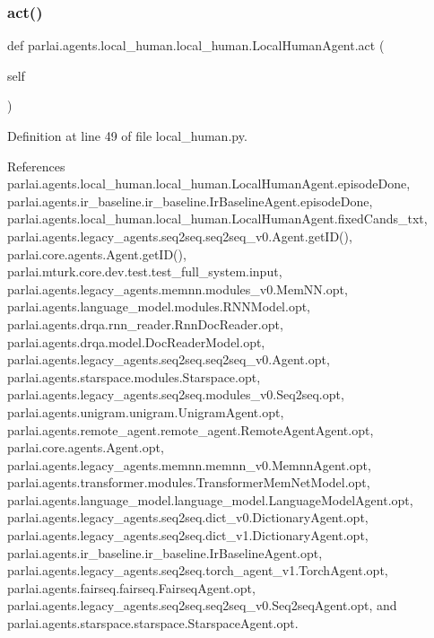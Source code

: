 \subsubsection{\texorpdfstring{act()}{act()}}
{\footnotesize\ttfamily def parlai.\+agents.\+local\+\_\+human.\+local\+\_\+human.\+Local\+Human\+Agent.\+act (\begin{DoxyParamCaption}\item[{}]{self }\end{DoxyParamCaption})}



Definition at line 49 of file local\+\_\+human.\+py.



References parlai.\+agents.\+local\+\_\+human.\+local\+\_\+human.\+Local\+Human\+Agent.\+episode\+Done, parlai.\+agents.\+ir\+\_\+baseline.\+ir\+\_\+baseline.\+Ir\+Baseline\+Agent.\+episode\+Done, parlai.\+agents.\+local\+\_\+human.\+local\+\_\+human.\+Local\+Human\+Agent.\+fixed\+Cands\+\_\+txt, parlai.\+agents.\+legacy\+\_\+agents.\+seq2seq.\+seq2seq\+\_\+v0.\+Agent.\+get\+I\+D(), parlai.\+core.\+agents.\+Agent.\+get\+I\+D(), parlai.\+mturk.\+core.\+dev.\+test.\+test\+\_\+full\+\_\+system.\+input, parlai.\+agents.\+legacy\+\_\+agents.\+memnn.\+modules\+\_\+v0.\+Mem\+N\+N.\+opt, parlai.\+agents.\+language\+\_\+model.\+modules.\+R\+N\+N\+Model.\+opt, parlai.\+agents.\+drqa.\+rnn\+\_\+reader.\+Rnn\+Doc\+Reader.\+opt, parlai.\+agents.\+drqa.\+model.\+Doc\+Reader\+Model.\+opt, parlai.\+agents.\+legacy\+\_\+agents.\+seq2seq.\+seq2seq\+\_\+v0.\+Agent.\+opt, parlai.\+agents.\+starspace.\+modules.\+Starspace.\+opt, parlai.\+agents.\+legacy\+\_\+agents.\+seq2seq.\+modules\+\_\+v0.\+Seq2seq.\+opt, parlai.\+agents.\+unigram.\+unigram.\+Unigram\+Agent.\+opt, parlai.\+agents.\+remote\+\_\+agent.\+remote\+\_\+agent.\+Remote\+Agent\+Agent.\+opt, parlai.\+core.\+agents.\+Agent.\+opt, parlai.\+agents.\+legacy\+\_\+agents.\+memnn.\+memnn\+\_\+v0.\+Memnn\+Agent.\+opt, parlai.\+agents.\+transformer.\+modules.\+Transformer\+Mem\+Net\+Model.\+opt, parlai.\+agents.\+language\+\_\+model.\+language\+\_\+model.\+Language\+Model\+Agent.\+opt, parlai.\+agents.\+legacy\+\_\+agents.\+seq2seq.\+dict\+\_\+v0.\+Dictionary\+Agent.\+opt, parlai.\+agents.\+legacy\+\_\+agents.\+seq2seq.\+dict\+\_\+v1.\+Dictionary\+Agent.\+opt, parlai.\+agents.\+ir\+\_\+baseline.\+ir\+\_\+baseline.\+Ir\+Baseline\+Agent.\+opt, parlai.\+agents.\+legacy\+\_\+agents.\+seq2seq.\+torch\+\_\+agent\+\_\+v1.\+Torch\+Agent.\+opt, parlai.\+agents.\+fairseq.\+fairseq.\+Fairseq\+Agent.\+opt, parlai.\+agents.\+legacy\+\_\+agents.\+seq2seq.\+seq2seq\+\_\+v0.\+Seq2seq\+Agent.\+opt, and parlai.\+agents.\+starspace.\+starspace.\+Starspace\+Agent.\+opt.



